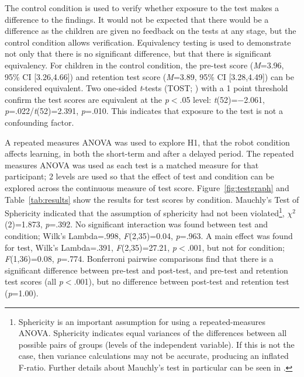 The control condition is used to verify whether exposure to the test makes a difference to the findings. It would not be expected that there would be a difference as the children are given no feedback on the tests at any stage, but the control condition allows verification. Equivalency testing is used to demonstrate not only that there is no significant difference, but that there is significant equivalency. For children in the control condition, the pre-test score (\textit{M}=3.96, 95\% CI [3.26,4.66]) and retention test score (\textit{M}=3.89, 95\% CI [3.28,4.49]) can be considered equivalent. Two one-sided \textit{t}-tests (TOST; \citealp{schuirmann1987comparison}) with a 1 point threshold confirm the test scores are equivalent at the \textit{p}$<$.05 level: \textit{t}(52)=$-$2.061, \textit{p}=.022/\textit{t}(52)=2.391, \textit{p}=.010. This indicates that exposure to the test is not a confounding factor.

A repeated measures ANOVA was used to explore H1, that the robot condition affects \gls{learning}, in both the short-term and after a delayed period. The repeated measures ANOVA was used as each test is a matched measure for that participant; 2 levels are used so that the effect of test and condition can be explored across the continuous measure of test score. Figure~\ref{fig:testgraph} and Table~\ref{tab:results} show the results for test scores by condition. Mauchly's Test of Sphericity indicated that the assumption of sphericity had not been violated\footnote{Sphericity is an important assumption for using a repeated-measures ANOVA. Sphericity indicates equal variances of the differences between all possible pairs of groups (levels of the independent variable). If this is not the case, then variance calculations may not be accurate, producing an inflated F-ratio. Further details about Mauchly's test in particular can be seen in \citet{mauchly1940significance}.}, $\chi^2$(2)=1.873, \textit{p}=.392. No significant interaction was found between test and condition; Wilk's Lambda=.998, \textit{F}(2,35)=0.04, \textit{p}=.963. A main effect was found for test, Wilk's Lambda=.391, \textit{F}(2,35)=27.21, \textit{p}$<$.001, but not for condition; \textit{F}(1,36)=0.08, \textit{p}=.774. Bonferroni pairwise comparisons find that there is a significant difference between pre-test and post-test, and pre-test and retention test scores (all \textit{p}$<$.001), but no difference between post-test and retention test (\textit{p}=1.00).

